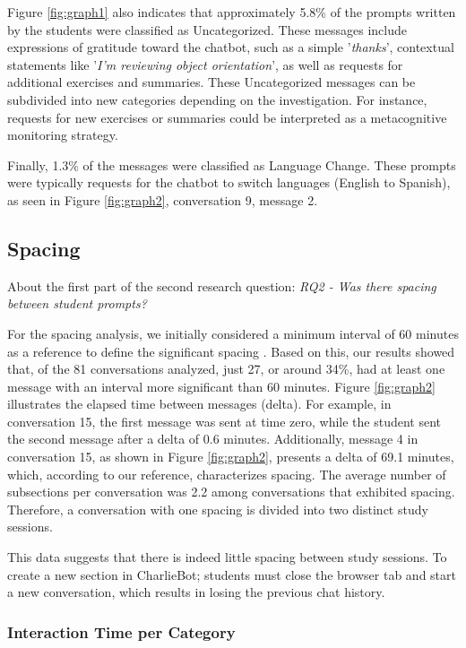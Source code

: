 \documentclass[a4paper,twoside]{article}
\begin{document}
Figure \ref{fig:graph1} also indicates that approximately 5.8\% of the prompts
written by the students were classified as Uncategorized. These messages include
expressions of gratitude toward the chatbot, such as a simple '\textit{thanks}',
contextual statements like '\textit{I'm reviewing object orientation}', as well
as requests for additional exercises and summaries. These Uncategorized messages
can be subdivided into new categories depending on the investigation. For
instance, requests for new exercises or summaries could be interpreted as a
metacognitive monitoring strategy.

Finally, 1.3\% of the messages were classified as Language Change. These prompts
were typically requests for the chatbot to switch languages (English to Spanish),
as seen in Figure \ref{fig:graph2}, conversation 9, message 2.

\subsection{Spacing}

About the first part of the second research question: \textit{RQ2 - Was there
spacing between student prompts?}

For the spacing analysis, we initially considered a minimum interval of 60
minutes as a reference to define the significant spacing \citep{Gadella24}.
Based on this, our results showed that, of the 81 conversations analyzed, just
27, or around 34\%, had at least one message with an interval more significant
than 60 minutes. Figure \ref{fig:graph2} illustrates the elapsed time between
messages (delta). For example, in conversation 15, the first message was sent
at time zero, while the student sent the second message after a delta of 0.6
minutes. Additionally, message 4 in conversation 15, as shown in Figure
\ref{fig:graph2}, presents a delta of 69.1 minutes, which, according to our
reference, characterizes spacing. The average number of subsections per
conversation was 2.2 among conversations that exhibited spacing. Therefore, a
conversation with one spacing is divided into two distinct study sessions.

This data suggests that there is indeed little spacing between study sessions.
To create a new section in CharlieBot; students must close the browser tab and
start a new conversation, which results in losing the previous chat history.

\subsubsection{Interaction Time per Category}
\end{document}
